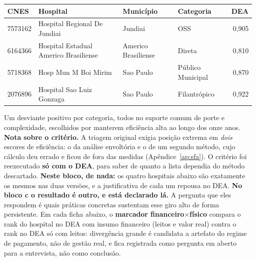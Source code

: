 \begin{center}\small
\begin{tabular}{llllr}
\toprule
CNES & Hospital & Município & Categoria & DEA \\
\midrule
7573162 & Hospital Regional De Jundiai & Jundiai & OSS & 0,905 \\
6164366 & Hospital Estadual Americo Brasiliense & Americo Brasiliense & Direta & 0,810 \\
5718368 & Hosp Mun M Boi Mirim & Sao Paulo & Público Municipal & 0,870 \\
2076896 & Hospital Sao Luiz Gonzaga & Sao Paulo & Filantrópico & 0,922 \\
\bottomrule
\end{tabular}
\end{center}

Um desviante positivo por categoria, todos no suporte comum de porte e
complexidade, escolhidos por manterem eficiência alta ao longo dos onze
anos. \textbf{Nota sobre o critério.} A triagem original exigia posição
extrema em \emph{dois} escores de eficiência: o da análise envoltória e o
de um segundo método, cujo cálculo deu errado e ficou de fora das medidas
(Apêndice~\ref{ap:sfa}). O critério foi reexecutado \textbf{só com o
DEA}, para saber de quanto a lista dependia do método descartado.
\textbf{Neste bloco, de nada:} os quatro hospitais abaixo são exatamente
os mesmos nas duas versões, e a justificativa de cada um repousa no DEA.
\textbf{No bloco c o resultado é outro, e está declarado lá.} A pergunta que eles respondem é quais práticas concretas sustentam
esse giro alto de forma persistente. Em cada ficha abaixo, o
\textbf{marcador financeiro$\times$físico} compara o rank do hospital no
DEA com insumo financeiro (leitos e valor real) contra o rank no DEA só
com leitos: divergência grande é candidata a artefato do regime de
pagamento, não de gestão real, e fica registrada como pergunta em aberto
para a entrevista, não como conclusão.

